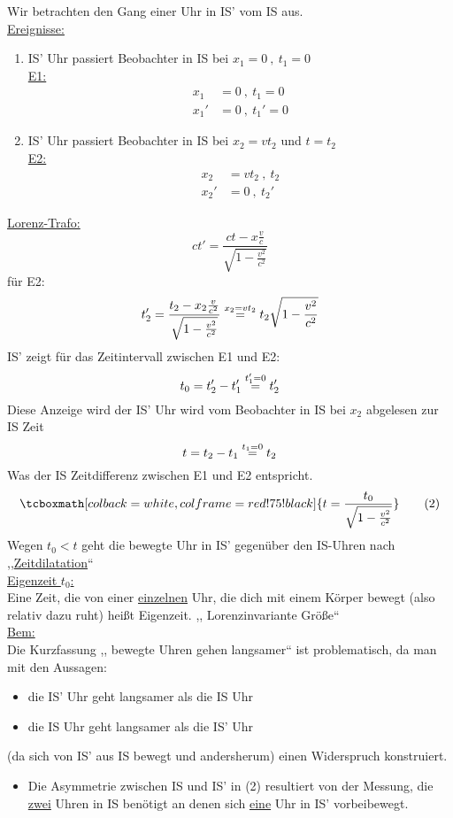 \documentclass[titlepage,12pt,a4paper,ngerman]{report}
\newcommand{\rmbox}[1]{\tcboxmath[colback=white,colframe=red!75!black]{#1}} %
\begin{document}
{Wir betrachten den Gang einer Uhr in IS' vom IS aus.\\
\underline{Ereignisse:}
\begin{enumerate}[1)]
	\item IS' Uhr passiert Beobachter in IS bei $ x_1 = 0\ , \ t_1 = 0 $\\
	\underline{E1:}
	\begin{align*}
	x_1 &= 0 \ , \ t_1 = 0 \\
	x_1' &= 0 \ , \ t_1' = 0
	\end{align*}
	\item IS' Uhr passiert Beobachter in IS bei $ x_2 = v t_2 $ und $ t = t_2 $\\
	\underline{E2:}
	\begin{align*}
	x_2 &= v t_2 \ , \ t_2\\
	x_2' &= 0 \ , \ t_2'
	\end{align*}
\end{enumerate}
\underline{Lorenz-Trafo:}
\begin{equation*}
ct' = \frac{ct - x \frac{v}{c}}{\sqrt{1 - \frac{v^2}{c^2}}}
\end{equation*}
für E2:
\begin{equation*}
t_2' = \frac{t_2 - x_2 \frac{v}{c^2}}{\sqrt{1 - \frac{v^2}{c^2}}} \buildrel x_2 = v t_2 \over = t_2 \sqrt{1 - \frac{v^2}{c^2}}
\end{equation*}
IS' zeigt für das Zeitintervall zwischen E1 und E2:
$$ t_0 = t_2' - t_1' \buildrel t_1' = 0 \over = t_2' $$
Diese Anzeige wird der IS' Uhr wird vom Beobachter in IS bei $ x_2 $ abgelesen zur IS Zeit
$$ t = t_2 - t_1 \buildrel t_1 = 0 \over = t_2 $$
Was der IS Zeitdifferenz zwischen E1 und E2 entspricht.
\begin{equation*}
\rmbox{ t = \frac{t_0}{\sqrt{1-\frac{v^2}{c^2}}} } \tag{2}
\end{equation*}
Wegen $ t_0 < t $ geht die bewegte Uhr in IS' gegenüber den IS-Uhren nach ,,\underline{Zeitdilatation}``\\[5pt]
\underline{Eigenzeit $ t_0 $:}\\
Eine Zeit, die von einer \underline{einzelnen} Uhr, die dich mit einem Körper bewegt (also relativ dazu ruht) heißt Eigenzeit. ,, Lorenzinvariante Größe``\\[5pt]
\underline{Bem:}\\
Die Kurzfassung ,, bewegte Uhren gehen langsamer`` ist problematisch, da man mit den Aussagen:
\begin{itemize}
	\item die IS' Uhr geht langsamer als die IS Uhr
	\item die IS Uhr geht langsamer als die IS' Uhr
\end{itemize}
(da sich von IS' aus IS bewegt und andersherum) einen Widerspruch konstruiert.
\begin{itemize}
	\item Die Asymmetrie zwischen IS und IS' in (2) resultiert von der Messung, die \underline{zwei} Uhren in IS benötigt an denen sich \underline{eine} Uhr in IS' vorbeibewegt.
\end{itemize} 
}
\end{document}
